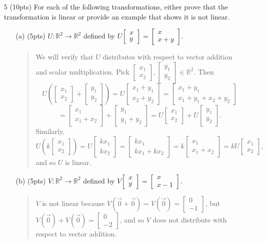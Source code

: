 \documentclass{article}
\newcommand{\R}{\mathbb{R}}
\newcommand{\mat}[1]{\begin{bmatrix}#1\end{bmatrix}}
\begin{document}
\begin{enumerate}
	\item[5 (10pts)] For each of the following transformations, either prove that the transformation is linear
		or provide an example that shows it is not linear.
	\begin{enumerate}
		\item[(a) (5pts)] $U:\R^2\to\R^2$ defined by
			$U\mat{x\\y}=\mat{x\\x+y}$.
			\begin{quote}
				We will verify that $U$ distributes with respect to vector addition and scalar multiplication.
				Pick $\mat{x_1\\x_2},\mat{y_1\\y_2}\in\R^2$.  Then
				\[
					U\left(\mat{x_1\\x_2}+\mat{y_1\\y_2}\right)=U\mat{x_1+y_1\\x_2+y_2}=
					\mat{x_1+y_1\\x_1+y_1+x_2+y_2}
				\]\[
					=\mat{x_1\\x_1+x_2}+\mat{y_1\\y_1+y_2}=U\mat{x_1\\x_2}+U\mat{y_1\\y_2}.
				\]
				Similarly,
				\[
					U\left(k\mat{x_1\\x_2}\right) = U\mat{kx_1\\kx_2}=\mat{kx_1\\kx_1+kx_2} = 
					k\mat{x_1\\x_1+x_2} = kU\mat{x_1\\x_2},
				\]
				and so $U$ is linear.
			\end{quote}
		\vspace{1in}
		\item[(b) (5pts)] $V:\R^2\to\R^2$ defined by 
			$V\mat{x\\y}=\mat{x\\x-1}$.
			\begin{quote}
				$V$ is not linear because $V(\vec 0+\vec 0) =V(\vec 0)= \mat{0\\-1}$, but $V(\vec 0)+V(\vec 0) = \mat{0\\-2}$,
				and so $V$ does not distribute with respect to vector addition.
			\end{quote}
	\end{enumerate}
	\clearpage


\end{enumerate}
\end{document}
